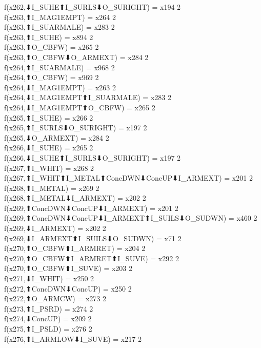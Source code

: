 f(x262,⬇I_SUHE⬆I_SURLS⬇O_SURIGHT) = x194 {2} \\
f(x263,⬆I_MAG1EMPT) = x264 {2} \\
f(x263,⬆I_SUARMALE) = x283 {2} \\
f(x263,⬆I_SUHE) = x894 {2} \\
f(x263,⬆O_CBFW) = x265 {2} \\
f(x263,⬆O_CBFW⬇O_ARMEXT) = x284 {2} \\
f(x264,⬆I_SUARMALE) = x968 {2} \\
f(x264,⬆O_CBFW) = x969 {2} \\
f(x264,⬇I_MAG1EMPT) = x263 {2} \\
f(x264,⬇I_MAG1EMPT⬆I_SUARMALE) = x283 {2} \\
f(x264,⬇I_MAG1EMPT⬆O_CBFW) = x265 {2} \\
f(x265,⬆I_SUHE) = x266 {2} \\
f(x265,⬆I_SURLS⬇O_SURIGHT) = x197 {2} \\
f(x265,⬇O_ARMEXT) = x284 {2} \\
f(x266,⬇I_SUHE) = x265 {2} \\
f(x266,⬇I_SUHE⬆I_SURLS⬇O_SURIGHT) = x197 {2} \\
f(x267,⬆I_WHIT) = x268 {2} \\
f(x267,⬆I_WHIT⬆I_METAL⬆ConcDWN⬇ConcUP⬇I_ARMEXT) = x201 {2} \\
f(x268,⬆I_METAL) = x269 {2} \\
f(x268,⬆I_METAL⬇I_ARMEXT) = x202 {2} \\
f(x269,⬆ConcDWN⬇ConcUP⬇I_ARMEXT) = x201 {2} \\
f(x269,⬆ConcDWN⬇ConcUP⬇I_ARMEXT⬆I_SUILS⬇O_SUDWN) = x460 {2} \\
f(x269,⬇I_ARMEXT) = x202 {2} \\
f(x269,⬇I_ARMEXT⬆I_SUILS⬇O_SUDWN) = x71 {2} \\
f(x270,⬆O_CBFW⬆I_ARMRET) = x204 {2} \\
f(x270,⬆O_CBFW⬆I_ARMRET⬆I_SUVE) = x292 {2} \\
f(x270,⬆O_CBFW⬆I_SUVE) = x203 {2} \\
f(x271,⬇I_WHIT) = x250 {2} \\
f(x272,⬆ConcDWN⬇ConcUP) = x250 {2} \\
f(x272,⬆O_ARMCW) = x273 {2} \\
f(x273,⬆I_PSRD) = x274 {2} \\
f(x274,⬇ConcUP) = x209 {2} \\
f(x275,⬆I_PSLD) = x276 {2} \\
f(x276,⬆I_ARMLOW⬇I_SUVE) = x217 {2} \\
